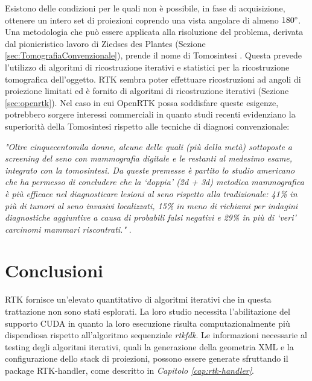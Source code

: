 \documentclass[a4paper,12pt, doubleside]{report}
\begin{document}
            \bigskip
            \par
                Esistono delle condizioni per le quali non è possibile, in fase di acquisizione, ottenere un intero set di proiezioni coprendo una vista angolare di almeno $180\degree$. Una metodologia che può essere applicata alla risoluzione del problema, derivata dal pionieristico lavoro di Ziedses des Plantes \cite{ziedses-tomo} (Sezione \ref{sec:TomografiaConvenzionale}), prende il nome di Tomosintesi \cite{tomosintesi}. Questa prevede l'utilizzo di algoritmi di ricostruzione iterativi e statistici per la ricostruzione tomografica dell'oggetto. RTK sembra poter effettuare ricostruzioni ad angoli di proiezione limitati \cite{rtk-users-tomosinthesys} ed è fornito di algoritmi di ricostruzione iterativi (Sezione \ref{sec:openrtk}). Nel caso in cui OpenRTK possa soddisfare queste esigenze, potrebbero sorgere interessi commerciali in quanto studi recenti \cite{studio-mammografia} evidenziano la superiorità della Tomosintesi rispetto alle tecniche di diagnosi convenzionale:
    
            \bigskip
            \par
                \textit{"Oltre cinquecentomila donne, alcune delle quali (più della metà) sottoposte a screening del seno con mammografia digitale e le restanti al medesimo esame, integrato con la tomosintesi. Da queste premesse è partito lo studio americano che ha permesso di concludere che la ‘doppia’ (2d + 3d) metodica mammografica è più efficace nel diagnosticare lesioni al seno rispetto alla tradizionale: 41\% in più di tumori al seno invasivi localizzati, 15\% in meno di richiami per indagini diagnostiche aggiuntive a causa di probabili falsi negativi e 29\% in più di ‘veri’ carcinomi mammari riscontrati."} \cite{fondazioneveronesi}.

        \section{Conclusioni}               
            \par
                RTK fornisce un'elevato quantitativo di algoritmi iterativi che in questa trattazione non sono stati esplorati. La loro studio necessita l'abilitazione del supporto CUDA in quanto la loro esecuzione risulta computazionalmente più dispendiosa rispetto all'algoritmo sequenziale \textit{rtkfdk}. Le informazioni necessarie al testing degli algoritmi iterativi, quali la generazione della geometria XML e la configurazione dello stack di proiezioni, possono essere generate sfruttando il package RTK-handler, come descritto in \textit{Capitolo \ref{cap:rtk-handler}}.
                    
\end{document}
